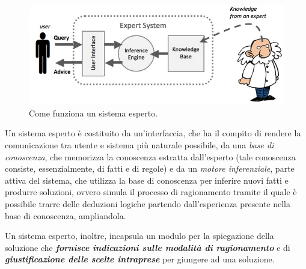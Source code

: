 \begin{figure}[here]
  \centering
  \includegraphics[scale=0.6]{pictures/expertsys}
  \caption{Come funziona un sistema esperto.}
  \label{fig:expertsys}
\end{figure}

Un sistema esperto è costituito da un'interfaccia, che ha il compito di rendere la comunicazione tra utente e sistema più naturale possibile, da una \emph{base di conoscenza}, che memorizza la conoscenza estratta dall'esperto (tale conoscenza consiste, essenzialmente, di fatti e di regole) e da un \emph{motore inferenziale}, parte attiva del sistema, che utilizza la base di conoscenza per inferire nuovi fatti e produrre soluzioni, ovvero simula il processo di ragionamento tramite il quale è possibile trarre delle deduzioni logiche partendo dall'esperienza presente nella base di conoscenza, ampliandola.

Un sistema esperto, inoltre, incapsula un modulo per la spiegazione della soluzione che \emph{\textbf{fornisce indicazioni sulle modalità di ragionamento}} e di \emph{\textbf{giustificazione delle scelte intraprese}} per giungere ad una soluzione.

